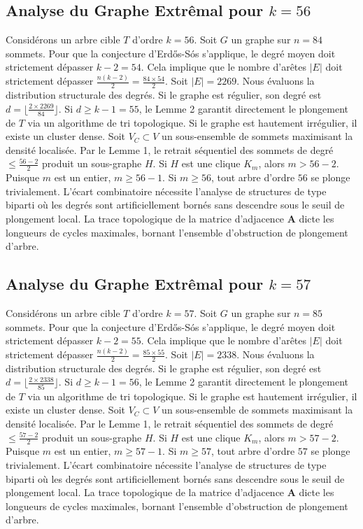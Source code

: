 \documentclass[11pt,a4paper]{article}
\begin{document}
\subsection{Analyse du Graphe Extr\^emal pour $k=56$}
Consid\'erons un arbre cible $T$ d'ordre $k=56$.
Soit $G$ un graphe sur $n=84$ sommets.
Pour que la conjecture d'Erd\H{o}s-S\'os s'applique, le degr\'e moyen doit strictement d\'epasser $k-2 = 54$.
Cela implique que le nombre d'ar\^etes $|E|$ doit strictement d\'epasser $\frac{n(k-2)}{2} = \frac{84 \times 54}{2}$.
Soit $|E| = 2269$.
Nous \'evaluons la distribution structurale des degr\'es. Si le graphe est r\'egulier, son degr\'e est $d = \lfloor \frac{2 \times 2269}{84} \rfloor$.
Si $d \geq k-1 = 55$, le Lemme 2 garantit directement le plongement de $T$ via un algorithme de tri topologique.
Si le graphe est hautement irr\'egulier, il existe un cluster dense. Soit $V_C \subset V$ un sous-ensemble de sommets maximisant la densit\'e localis\'ee.
Par le Lemme 1, le retrait s\'equentiel des sommets de degr\'e $\leq \frac{56-2}{2}$ produit un sous-graphe $H$.
Si $H$ est une clique $K_{m}$, alors $m > 56-2$. Puisque $m$ est un entier, $m \geq 56-1$. Si $m \geq 56$, tout arbre d'ordre $56$ se plonge trivialement.
L'\'ecart combinatoire n\'ecessite l'analyse de structures de type biparti o\`u les degr\'es sont artificiellement born\'es sans descendre sous le seuil de plongement local. La trace topologique de la matrice d'adjacence $\mathbf{A}$ dicte les longueurs de cycles maximales, bornant l'ensemble d'obstruction de plongement d'arbre.


\subsection{Analyse du Graphe Extr\^emal pour $k=57$}
Consid\'erons un arbre cible $T$ d'ordre $k=57$.
Soit $G$ un graphe sur $n=85$ sommets.
Pour que la conjecture d'Erd\H{o}s-S\'os s'applique, le degr\'e moyen doit strictement d\'epasser $k-2 = 55$.
Cela implique que le nombre d'ar\^etes $|E|$ doit strictement d\'epasser $\frac{n(k-2)}{2} = \frac{85 \times 55}{2}$.
Soit $|E| = 2338$.
Nous \'evaluons la distribution structurale des degr\'es. Si le graphe est r\'egulier, son degr\'e est $d = \lfloor \frac{2 \times 2338}{85} \rfloor$.
Si $d \geq k-1 = 56$, le Lemme 2 garantit directement le plongement de $T$ via un algorithme de tri topologique.
Si le graphe est hautement irr\'egulier, il existe un cluster dense. Soit $V_C \subset V$ un sous-ensemble de sommets maximisant la densit\'e localis\'ee.
Par le Lemme 1, le retrait s\'equentiel des sommets de degr\'e $\leq \frac{57-2}{2}$ produit un sous-graphe $H$.
Si $H$ est une clique $K_{m}$, alors $m > 57-2$. Puisque $m$ est un entier, $m \geq 57-1$. Si $m \geq 57$, tout arbre d'ordre $57$ se plonge trivialement.
L'\'ecart combinatoire n\'ecessite l'analyse de structures de type biparti o\`u les degr\'es sont artificiellement born\'es sans descendre sous le seuil de plongement local. La trace topologique de la matrice d'adjacence $\mathbf{A}$ dicte les longueurs de cycles maximales, bornant l'ensemble d'obstruction de plongement d'arbre.
\end{document}
